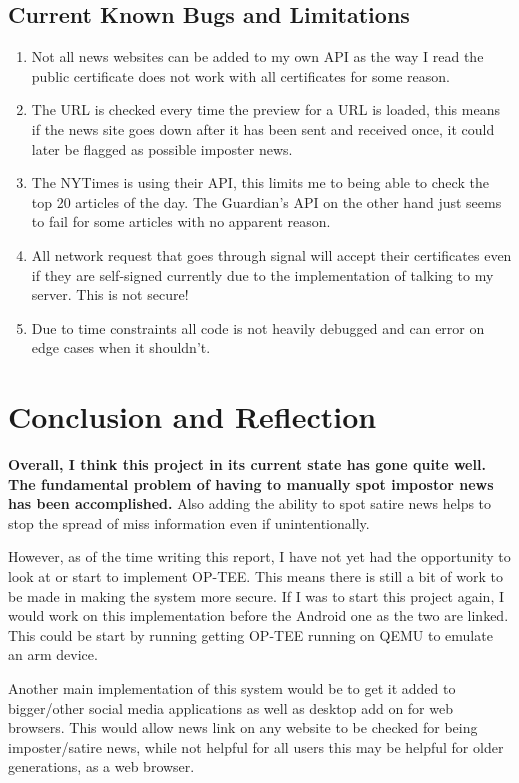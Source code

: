 \documentclass[11pt,a4paper]{report}
\begin{document}
\subsection{Current Known Bugs and Limitations}
\begin{enumerate}
  \item Not all news websites can be added to my own API as the way I read the public certificate does not work with all certificates for some reason.
  \item The URL is checked every time the preview for a URL is loaded, this means if the news site goes down after it has been sent and received once, it could later be flagged as possible imposter news.
  \item The NYTimes is using their API, this limits me to being able to check the top 20 articles of the day. The Guardian’s API on the other hand just seems to fail for some articles with no apparent reason.
  \item All network request that goes through signal will accept their certificates even if they are self-signed currently due to the implementation of talking to my server. This is not secure!
  \item Due to time constraints all code is not heavily debugged and can error on edge cases when it shouldn’t.
\end{enumerate}
\newpage
\section{Conclusion and Reflection}
\textbf{Overall, I think this project in its current state has gone quite well. The fundamental problem of having to manually spot impostor news has been accomplished.} Also adding the ability to spot satire news helps to stop the spread of miss information even if unintentionally.

However, as of the time writing this report, I have not yet had the opportunity to look at or start to implement OP-TEE. This means there is still a bit of work to be made in making the system more secure. If I was to start this project again, I would work on this implementation before the Android one as the two are linked. This could be start by running getting OP-TEE running on QEMU to emulate an arm device.

Another main implementation of this system would be to get it added to bigger/other social media applications as well as desktop add on for web browsers. This would allow news link on any website to be checked for being imposter/satire news, while not helpful for all users this may be helpful for older generations, as a web browser.
\end{document}
